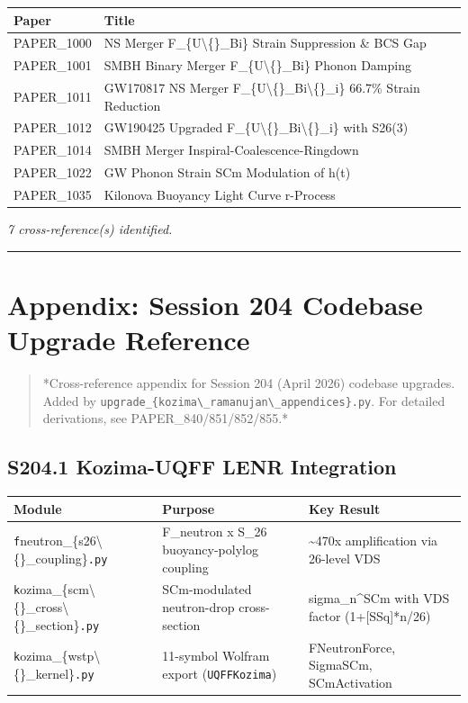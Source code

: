 \documentclass[11pt]{article}
\begin{document}
\begin{center}
\begin{longtable}{ll}
\toprule
Paper & Title \tabularnewline
\midrule
\endhead
PAPER\_1000 & NS Merger F\_\{U\textbackslash\{\}\_Bi\} Strain Suppression \& BCS Gap \tabularnewline
PAPER\_1001 & SMBH Binary Merger F\_\{U\textbackslash\{\}\_Bi\} Phonon Damping \tabularnewline
PAPER\_1011 & GW170817 NS Merger F\_\{U\textbackslash\{\}\_Bi\textbackslash\{\}\_i\} 66.7\% Strain Reduction \tabularnewline
PAPER\_1012 & GW190425 Upgraded F\_\{U\textbackslash\{\}\_Bi\textbackslash\{\}\_i\} with S26(3) \tabularnewline
PAPER\_1014 & SMBH Merger Inspiral-Coalescence-Ringdown \tabularnewline
PAPER\_1022 & GW Phonon Strain SCm Modulation of h(t) \tabularnewline
PAPER\_1035 & Kilonova Buoyancy Light Curve r-Process \tabularnewline
\bottomrule
\end{longtable}
\end{center}

\emph{7 cross-reference(s) identified.}

\noindent\rule{\textwidth}{0.4pt}

\section*{Appendix: Session 204 Codebase Upgrade Reference}

\begin{quote}
*Cross-reference appendix for Session 204 (April 2026) codebase upgrades.
Added by \verb|upgrade_{kozima\_ramanujan\_appendices}.py|. For detailed derivations,
see PAPER\_840/851/852/855.*
\end{quote}

\subsection*{S204.1 Kozima-UQFF LENR Integration}

\begin{center}
\begin{longtable}{lll}
\toprule
Module & Purpose & Key Result \tabularnewline
\midrule
\endhead
\verb|f|neutron\_\{s26\textbackslash\{\}\_coupling\}\verb|.py| & F\_neutron x S\_26 buoyancy-polylog coupling & \textasciitilde{}470x amplification via 26-level VDS \tabularnewline
\verb|k|ozima\_\{scm\textbackslash\{\}\_cross\textbackslash\{\}\_section\}\verb|.py| & SCm-modulated neutron-drop cross-section & sigma\_n\textasciicircum{}SCm with VDS factor (1+[SSq]*n/26) \tabularnewline
\verb|k|ozima\_\{wstp\textbackslash\{\}\_kernel\}\verb|.py| & 11-symbol Wolfram export (\verb|UQFFKozima|) & FNeutronForce, SigmaSCm, SCmActivation \tabularnewline
\bottomrule
\end{longtable}
\end{center}
\end{document}
